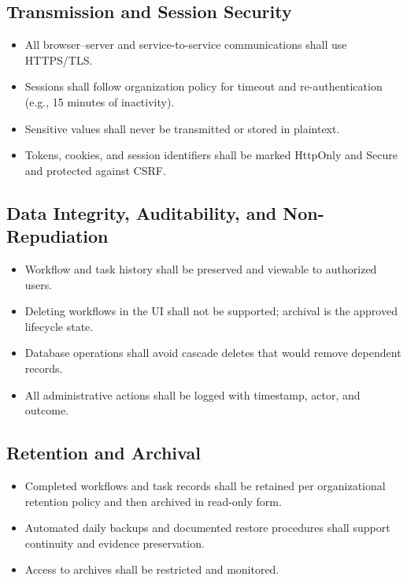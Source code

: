 \documentclass[12pt]{article}
\begin{document}
\subsection{Transmission and Session Security}
\begin{itemize}
    \item All browser--server and service-to-service communications shall use HTTPS/TLS.
    \item Sessions shall follow organization policy for timeout and re-authentication (e.g.,
    15 minutes of inactivity).
    \item Sensitive values shall never be transmitted or stored in plaintext.
    \item Tokens, cookies, and session identifiers shall be marked HttpOnly and Secure and
    protected against CSRF.
\end{itemize}

\subsection{Data Integrity, Auditability, and Non-Repudiation}
\begin{itemize}
    \item Workflow and task history shall be preserved and viewable to authorized users.
    \item Deleting workflows in the UI shall not be supported; archival is the approved
    lifecycle state.
    \item Database operations shall avoid cascade deletes that would remove dependent records.
    \item All administrative actions shall be logged with timestamp, actor, and outcome.
\end{itemize}

\subsection{Retention and Archival}
\begin{itemize}
    \item Completed workflows and task records shall be retained per organizational retention
    policy and then archived in read-only form.
    \item Automated daily backups and documented restore procedures shall support continuity
    and evidence preservation.
    \item Access to archives shall be restricted and monitored.
\end{itemize}
\end{document}
